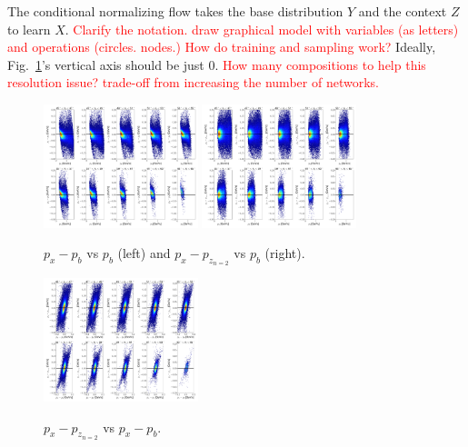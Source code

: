 The conditional normalizing flow takes the base distribution $Y$ and the context $Z$ to learn $X$. \textcolor{red}{Clarify the notation. draw graphical model with variables (as letters) and operations (circles. nodes.) How do training and sampling work?} Ideally, Fig.~\ref{fig: jul8_NF}'s vertical axis should be just 0. \textcolor{red}{How many compositions to help this resolution issue? trade-off from increasing the number of networks.} 
\begin{figure}[htb]
\centering
\includegraphics[width = 0.4\textwidth]{Chapters/Ch3-Simulations/normalizing_flows/pics/MeetingFigures/Sangbaek/raw.pdf}
\includegraphics[width = 0.4\textwidth]{Chapters/Ch3-Simulations/normalizing_flows/pics/MeetingFigures/Sangbaek/NF.pdf}
\caption[Placeholder Short text]{$p_x - p_{b}$ vs $p_{b}$ (left) and $p_x - p_{z_{n=2}}$ vs $p_{b}$ (right).}
\label{fig: jul8_NF}
\end{figure}

\begin{figure}[htb]
\centering
\includegraphics[width = 0.4\textwidth]{Chapters/Ch3-Simulations/normalizing_flows/pics/MeetingFigures/Sangbaek/direct.pdf}
\label{fig: jul8_direct}
\caption[Placeholder Short text]{$p_x - p_{z_{n=2}}$ vs $p_x - p_{b}$.}
\end{figure}

